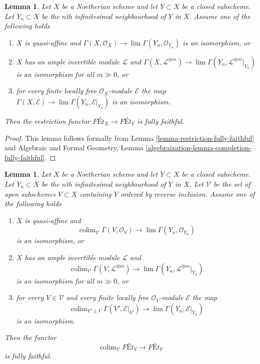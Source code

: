 \documentclass{stacks-project}
\theoremstyle{plain}
\newtheorem{lemma}[subsection]{Lemma}
\theoremstyle{definition}
\theoremstyle{remark}
\numberwithin{equation}{subsection}
\def\lim{\mathop{\mathrm{lim}}\nolimits}
\def\colim{\mathop{\mathrm{colim}}\nolimits}
\begin{document}
\begin{lemma}
\label{lemma-restriction-fully-faithful-special}
Let $X$ be a Noetherian scheme and let $Y \subset X$ be a closed subscheme.
Let $Y_n \subset X$ be the $n$th infinitesimal neighbourhood of $Y$ in $X$.
Assume one of the following holds
\begin{enumerate}
\item $X$ is quasi-affine and
$\Gamma(X, \mathcal{O}_X) \to \lim \Gamma(Y_n, \mathcal{O}_{Y_n})$
is an isomorphism, or
\item $X$ has an ample invertible module $\mathcal{L}$ and
$\Gamma(X, \mathcal{L}^{\otimes m}) \to
\lim \Gamma(Y_n, \mathcal{L}^{\otimes m}|_{Y_n})$
is an isomorphism for all $m \gg 0$, or
\item for every finite locally free $\mathcal{O}_X$-module
$\mathcal{E}$ the map
$\Gamma(X, \mathcal{E}) \to \lim \Gamma(Y_n, \mathcal{E}|_{Y_n})$
is an isomorphism.
\end{enumerate}
Then the restriction functor $\textit{F\'Et}_X \to \textit{F\'Et}_Y$
is fully faithful.
\end{lemma}

\begin{proof}
This lemma follows formally from
Lemma \ref{lemma-restriction-fully-faithful} and
Algebraic and Formal Geometry, Lemma
\ref{algebraization-lemma-completion-fully-faithful}.
\end{proof}

\begin{lemma}
\label{lemma-restriction-fully-faithful-general-special}
Let $X$ be a Noetherian scheme and let $Y \subset X$ be a closed subscheme.
Let $Y_n \subset X$ be the $n$th infinitesimal neighbourhood of $Y$ in $X$.
Let $\mathcal{V}$ be the set of open subschemes $V \subset X$ containing $Y$
ordered by reverse inclusion. Assume one of the following holds
\begin{enumerate}
\item $X$ is quasi-affine and
$$
\colim_\mathcal{V} \Gamma(V, \mathcal{O}_V)
\longrightarrow
\lim \Gamma(Y_n, \mathcal{O}_{Y_n})
$$
is an isomorphism, or
\item $X$ has an ample invertible module $\mathcal{L}$ and
$$
\colim_\mathcal{V} \Gamma(V, \mathcal{L}^{\otimes m})
\longrightarrow
\lim \Gamma(Y_n, \mathcal{L}^{\otimes m}|_{Y_n})
$$
is an isomorphism for all $m \gg 0$, or
\item for every $V \in \mathcal{V}$ and every finite locally free
$\mathcal{O}_V$-module $\mathcal{E}$ the map
$$
\colim_{V' \geq V} \Gamma(V', \mathcal{E}|_{V'})
\longrightarrow
\lim \Gamma(Y_n, \mathcal{E}|_{Y_n})
$$
is an isomorphism.
\end{enumerate}
Then the functor
$$
\colim_\mathcal{V} \textit{F\'Et}_V \to \textit{F\'Et}_Y
$$
is fully faithful.
\end{lemma}
\end{document}
